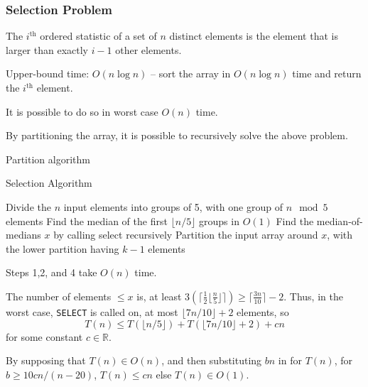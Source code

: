 \documentclass[10pt]{article}
\begin{document}
\subsubsection{Selection Problem}
The $i^\text{th}$ ordered statistic of a set of $n$ distinct elements is the element that is larger than exactly $i-1$ other elements.

Upper-bound time: $O(n\log n)$ -- sort the array in $O(n\log n)$ time and return the $i^\text{th}$ element.

It is possible to do so in worst case $O(n)$ time.

By partitioning the array, it is possible to recursively solve the above problem.
\begin{algorithm}
	\caption{Partition algorithm}
	\KwOut{An index $q'$ with $p\le q'\le r$ such that $A[p..r)$ is a permutation of $A$, $\forall a \in A[p..q') \Rightarrow a<m\,\wedge\,\forall a\in A[q'..r)\Rightarrow a\ge m\,\wedge\,A[q']=m$.}
\end{algorithm}
\begin{algorithm}
	\caption{Selection Algorithm}
	Divide the $n$ input elements into groups of 5, with one group of $n\mod 5$ elements\;
	Find the median of the first $\lfloor n/5\rfloor$ groups in $O(1)$\;
	Find the median-of-medians $x$ by calling select recursively\;
	Partition the input array around $x$, with the lower partition having $k-1$ elements\;
	\Else{
	\lIf{$i<k$}{\SEL{$A[0..k),i$}}\lElse{\SEL{$A[k+1..n),i-k$}}
	}
\end{algorithm}

Steps 1,2, and 4 take $O(n)$ time.

The number of elements $\le x$ is, at least $3\left(\lceil\frac12\lfloor\frac n5\rfloor\rceil\right)\ge\lceil\frac{3n}{10}\rceil-2$.
Thus, in the worst case, \texttt{SELECT} is called on, at most $\lfloor 7n/10\rfloor+2$ elements, so \[T(n)\le T(\lfloor n/5\rfloor)+T(\lfloor7n/10\rfloor+2)+cn\]for some constant $c\in\mathbb R$.

By supposing that $T(n)\in O(n)$, and then substituting $bn$ in for $T(n)$, for $b\ge 10cn/(n-20)$, $T(n)\le cn$ else $T(n)\in O(1)$.
\end{document}
